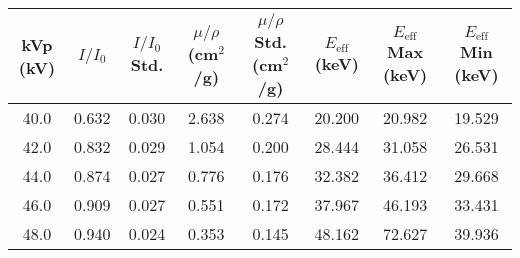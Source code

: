 \begin{tabular}{cccccccc}
\toprule
 kVp (kV) &  $I/I_0$ &  $I/I_0$ Std. &  $\mu/\rho$ (cm$^2$/g) &  $\mu/\rho$ Std. (cm$^2$/g) &  $E_{\text{eff}}$ (keV) &  $E_{\text{eff}}$ Max (keV) &  $E_{\text{eff}}$ Min (keV) \\
\midrule
     40.0 &    0.632 &         0.030 &                  2.638 &                       0.274 &                  20.200 &                      20.982 &                      19.529 \\
     42.0 &    0.832 &         0.029 &                  1.054 &                       0.200 &                  28.444 &                      31.058 &                      26.531 \\
     44.0 &    0.874 &         0.027 &                  0.776 &                       0.176 &                  32.382 &                      36.412 &                      29.668 \\
     46.0 &    0.909 &         0.027 &                  0.551 &                       0.172 &                  37.967 &                      46.193 &                      33.431 \\
     48.0 &    0.940 &         0.024 &                  0.353 &                       0.145 &                  48.162 &                      72.627 &                      39.936 \\
\bottomrule
\end{tabular}
